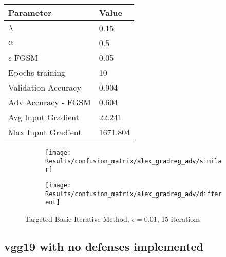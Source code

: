 \documentclass[draft,final]{vutinfth} %
\begin{document}
\begin{table}[h]
  \centering
  \begin{tabular}{ll}
    \toprule
			Parameter			& Value   \\
    \midrule
			$\lambda$								& 0.15		\\
			$\alpha$								& 0.5			\\
			$\epsilon$ FGSM					& 0.05		\\
			Epochs training					& 10			\\
			
			Validation Accuracy			& 0.904		\\
			Adv Accuracy - FGSM			& 0.604		\\
			
			Avg Input Gradient			& 22.241	\\
			Max Input Gradient			& 1671.804\\
    \bottomrule
  \end{tabular}
\end{table}

\begin{figure}[h]
  \begin{subfigure}[b]{0.5\columnwidth}
		\centering
    \texttt{[image: Results/confusion\_matrix/alex\_gradreg\_adv/similar]}
    \label{fig:exp:cm:alex_gradreg_adv:similar}
  \end{subfigure}
  \begin{subfigure}[b]{0.5\columnwidth}
		\centering
    \texttt{[image: Results/confusion\_matrix/alex\_gradreg\_adv/different]}
    \label{fig:exp:cm:alex_gradreg_adv:different}
  \end{subfigure}
  \caption{Targeted Basic Iterative Method, $\epsilon = 0.01$, 15 iterations}
	\label{fig:exp:cm:alex_gradreg_adv}
\end{figure}
\clearpage



\subsection{vgg19 with no defenses implemented}
\end{document}
